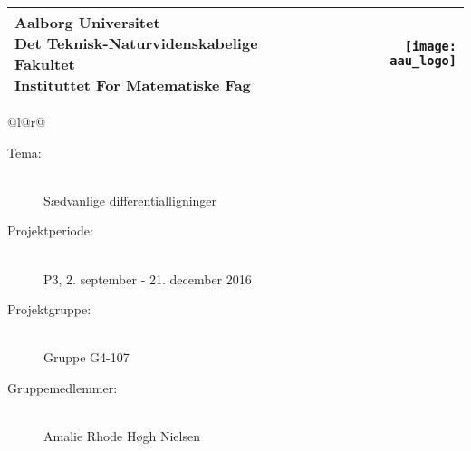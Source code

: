 
\newlength{\realparindent}
\newlength{\realparskip}
\setlength{\realparindent}{\parindent}
\setlength{\realparskip}{\parskip}



\begin{nopagebreak}
{
\begin{center}
    \samepage
    \begin{tabular*}{\textwidth}{@{} l @{\extracolsep{\fill}}r@{}}
        \parbox[b]{11cm}{
            {\LARGE Aalborg Universitet} \\
            {\large Det Teknisk-Naturvidenskabelige Fakultet}\\
            {\large Instituttet For Matematiske Fag}
        }
        & \texttt{[image: aau\_logo]} \\
        \hline
    \end{tabular*}
    \vspace{0.4cm}

    \begin{tabular*}{\textwidth}{@{}l@{\extracolsep{\fill}}r@{}}
        \\
        \begin{minipage}[t]{0.49\textwidth}
            \begin{description}
                \item[Tema:]~\\
                Sædvanlige differentialligninger
                \vspace{0.5cm}
                \item[Projektperiode:]~\\
                P3, 2. september - 21. december 2016
                \vspace{0.5cm}

                \item[Projektgruppe:]~\\
                Gruppe G4-107
                \vspace{0.5cm}  
                \item[Gruppemedlemmer:]~\\
                Amalie Rhode Høgh Nielsen 


\end{description}
\end{minipage}
\end{tabular*}
\end{center}}
\end{nopagebreak}
